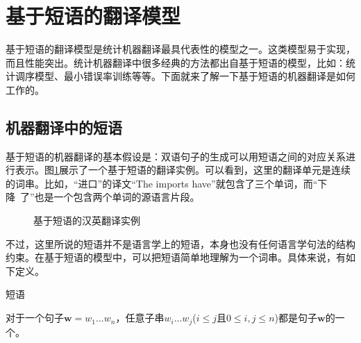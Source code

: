 
\sectionnewpage
\section{基于短语的翻译模型}\label{section-4.2}

\parinterval 基于短语的翻译模型是统计机器翻译最具代表性的模型之一\cite{koehn2003statistical,chiang2007hierarchical}。这类模型易于实现，而且性能突出。统计机器翻译中很多经典的方法都出自基于短语的模型，比如：统计调序模型、最小错误率训练等等。下面就来了解一下基于短语的机器翻译是如何工作的。


\subsection{机器翻译中的短语}

\parinterval 基于短语的机器翻译的基本假设是：双语句子的生成可以用短语之间的对应关系进行表示。图\ref{fig:4-9}展示了一个基于短语的翻译实例。可以看到，这里的翻译单元是连续的词串。比如，``进口''的译文``The imports have''就包含了三个单词，而``下降\ 了''也是一个包含两个单词的源语言片段。

\begin{figure}[htp]
\centering

\caption{基于短语的汉英翻译实例}
\label{fig:4-9}
\end{figure}

\parinterval 不过，这里所说的短语并不是语言学上的短语，本身也没有任何语言学句法的结构约束。在基于短语的模型中，可以把短语简单地理解为一个词串。具体来说，有如下定义。

\begin{definition} 短语

{\small
对于一个句子$\mathbf{w} = w_1...w_n$，任意子串$w_i...w_j$($i\leq j$且$0\leq i,j\leq n$)都是句子$\mathbf{w}$的一个{\small{}}。
}
\end{definition}


